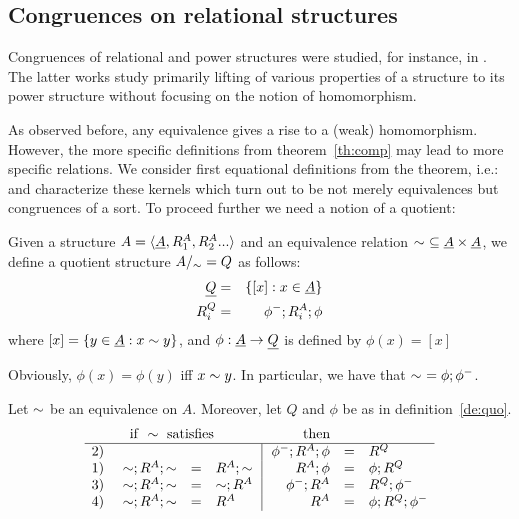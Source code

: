 \documentclass[10pt]{article}
\begin{document}

\subsection{Congruences on relational structures}
\label{sub:congrel}
Congruences of relational and power structures were studied, for instance, in
\cite{relhoms, koh1, brink93, brink97}. The latter works study primarily 
lifting of various properties of a structure to its power structure
without focusing on the notion of homomorphism.

As observed
before, any equivalence gives a rise to a (weak) homomorphism.
However, the more specific definitions from theorem~\ref{th:comp} may
lead to more specific relations. We consider first equational
definitions from the theorem, i.e.: 
and characterize these kernels which turn out to be not merely
equivalences but congruences of a sort. To proceed further we need a
notion of a quotient:

\begin{Definition}
\label{de:quo}
Given a structure $A=\langle\underline {A},R_1^A,R_2^A...\rangle$ and an equivalence
relation $\sim\ \subseteq \underline {A}\times\underline {A}$, we define a
quotient structure $A/_{\sim} = Q$ as follows:
\begin{eqnarray*}
\underline {Q} & = & \{[x] : x\in\underline {A}\} \\
R_i^Q    & = & \phi^-;R_i^A;\phi
\end{eqnarray*}
where $[x] = \{y\in\underline {A}:x\sim y\}$, and $\phi:\underline {A}\rightarrow
\underline {Q}$ is defined by $\phi(x)=[x]$
\end{Definition}
%
Obviously, $\phi(x)=\phi(y)$ iff $x\sim y$. In particular, we have
that $\sim\ = \phi;\phi^-$.

\begin{Prop}
\label{pro:cong}\label{le:canonichom}
Let $\sim$ be an equivalence on $A$. Moreover, let $Q$ and $\phi$ be
as in definition~\ref{de:quo}.
\[
\begin{array}{r@{\ \ \ \ }rcl@{\ \ }|@{\ \ }rcl}
& \multicolumn{3}{l}{{\rm if\ }\congo\ {\rm satisfies}} & \multicolumn{2}{c}{{\rm then}} \\ \hline
2) &   & &                               & \phi^-;R^A;\phi &=& R^Q \\
1) & \congo;R^A;\congo & = & R^A;\congo  & R^A;\phi &=& \phi;R^Q \\
3) & \congo;R^A;\congo & = & \congo;R^A  & \phi^-;R^A &=& R^Q;\phi^- \\
4) & \congo;R^A;\congo & = & R^A         & R^A &=& \phi;R^Q;\phi^-
\end{array}
\]
\end{Prop}
\end{document}
